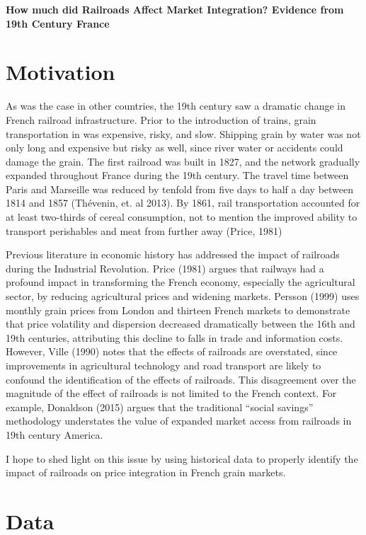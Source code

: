\documentclass[12pt,twoside]{article}
\begin{document}
\begin{centering}
\textbf{How much did Railroads Affect Market Integration? Evidence from 19th Century France}
\end{centering}

\section{Motivation}

As was the case in other countries, the 19th century saw a dramatic change in French railroad infrastructure.
Prior to the introduction of trains, grain transportation in was expensive, risky, and slow.
Shipping grain by water was not only long and expensive but risky as well, since river water or accidents could damage the grain.
The first railroad was built in 1827, and the network gradually expanded throughout France during the 19th century.
The travel time between Paris and Marseille was reduced by tenfold from five days to half a day between 1814 and 1857 (Th\'{e}venin, et. al 2013).
By 1861, rail transportation accounted for at least two-thirds of cereal consumption, not to mention the improved ability to transport perishables and meat from further away (Price, 1981)

Previous literature in economic history has addressed the impact of railroads during the Industrial Revolution.
Price (1981) argues that railways had a profound impact in transforming the French economy, especially the agricultural sector, by reducing agricultural prices and widening markets.
Persson (1999) uses monthly grain prices from London and thirteen French markets to demonstrate that price volatility and dispersion decreased dramatically between the 16th and 19th centuries, attributing this decline to falls in trade and information costs.
However, Ville (1990) notes that the effects of railroads are overstated, since improvements in agricultural technology and road transport are likely to confound the identification of the effects of railroads.
This disagreement over the magnitude of the effect of railroads is not limited to the French context.
For example, Donaldson (2015) argues that the traditional ``social savings'' methodology understates the value of expanded market access from railroads in 19th century America.

I hope to shed light on this issue by using historical data to properly identify the impact of railroads on price integration in French grain markets.

\section{Data}
\end{document}
